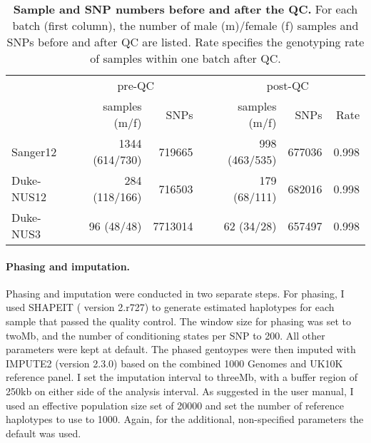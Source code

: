 \begin{table}[htbp]
  \centering
  \caption[\textbf{Sample and SNP numbers before and after the QC. }]{\textbf{Sample and SNP numbers before and after the QC. } For each batch (first column), the number of male (m)/female (f) samples and SNPs before and after QC are listed. Rate specifies the genotyping rate of samples within one batch after QC. }
    \begin{tabular}{lrrrrrr}
    \toprule
          & \multicolumn{2}{c}{pre-QC} &       & \multicolumn{3}{c}{post-QC} \\
\cmidrule{2-3}\cmidrule{5-7}          & samples (m/f) & SNPs  &       & samples (m/f) & SNPs  & Rate \\
\cmidrule{2-7}    Sanger12 & \num{1344}  (\num{614}/\num{730}) & \num{719665} &       & \num{998} (\num{463}/\num{535}) & \num{677036} & \num{0.998} \\
    Duke-NUS12 & \num{284} (\num{118}/\num{166}) & \num{716503} &       & \num{179} (\num{68}/\num{111}) & \num{682016} & \num{0.998} \\
    Duke-NUS3 & \num{96} (\num{48}/\num{48}) & \num{7713014} &       & \num{62} (\num{34}/\num{28}) & \num{657497} & \num{0.998} \\
    \bottomrule
    \end{tabular}%
    \label{tab:genoOverview}%
\end{table}%

\paragraph{Phasing and imputation.} Phasing and imputation were conducted in two separate steps. For phasing, I used SHAPEIT ( version 2.r727) \citep{Delaneau2012,Delaneau2013} to generate estimated haplotypes for each sample that passed the quality control. The window size for phasing was set to twoMb, and the number of conditioning states per SNP to \num{200}. All other parameters were kept at default. The phased gentoypes were then imputed with IMPUTE2  (version 2.3.0) \citep{Marchini2007, Howie2009} based on the combined \num{1000} Genomes \citep{Abecasis2012} and UK10K \citep{UK10KConsortium2014} reference panel. I set the imputation interval to threeMb,  with a buffer region of \num{250}kb on either side of the analysis interval. As suggested in the user manual, I used an effective population size set of \num{20000} and set the number of reference haplotypes to use to \num{1000}. Again, for the additional, non-specified parameters the default was used.

